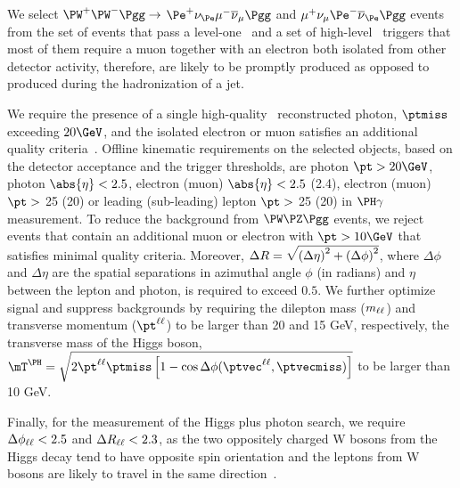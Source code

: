 We select $\PW^+\PW^-\Pgg\to$ $\Pe^+\nu_{\Pe}\mu^-\overline{\nu}_{\mu}\Pgg$ and $\mu^+\nu_{\mu}\Pe^-\overline{\nu}_{\Pe}\Pgg$ events from the set of events that pass a level-one~\cite{Sirunyan:2020zal} and a set of high-level~\cite{Khachatryan:2016bia} triggers that most of them require a muon together with an electron both isolated from other detector activity, therefore, are likely to be promptly produced as opposed to produced during the hadronization of a jet. 

We require the presence of a single high-quality~\cite{CMS:EGM-14-001} reconstructed photon, $\ptmiss$ exceeding $20\GeV$, and the isolated electron or muon satisfies an additional quality criteria~\cite{Sirunyan:2018,Khachatryan:2015hwa}. Offline kinematic requirements on the selected objects, based on the detector acceptance and the trigger thresholds, are photon $\pt>20\GeV$, photon $\abs{\eta}<2.5$, electron (muon) $\abs{\eta}< 2.5$ (2.4), electron (muon) $\pt > $ 25 (20) \GeV or leading (sub-leading) lepton $\pt>$ 25 (20) \GeV in $\PH\gamma$ measurement. To reduce the background from $\PW\PZ\Pgg$ events, we reject events that contain an additional muon or electron with $\pt > 10\GeV$ that satisfies minimal quality criteria. Moreover, $\Delta R = \sqrt{\smash[b]{\left(\Delta\eta\right)^2 + \left(\Delta\phi\right)^2}}$, where $\Delta \phi$ and $\Delta \eta$ are the spatial separations in azimuthal angle $\phi$ (in radians) and $\eta$ between the lepton and photon, is required to exceed $0.5$. We further optimize signal and suppress backgrounds by requiring the dilepton mass ($m_{\ell\ell}$) and transverse momentum ($\ptll$) to be larger than 20 and 15 GeV, respectively, the transverse mass of the Higgs boson, $\mTH = \sqrt{2 \ptll \ptmiss \left[1 - \cos\Delta\phi(\ptvecll, \ptvecmiss)\right]}$ to be larger than 10 GeV. 

Finally, for the measurement of the Higgs plus photon search, we require $\Delta\phi_{\ell\ell}<2.5$ and $\Delta R_{\ell\ell}<2.3$, as the two oppositely charged W bosons from the Higgs decay tend to have opposite spin orientation and the leptons from W bosons are likely to travel in the same direction~\cite{Dittmar:1996ss}.

